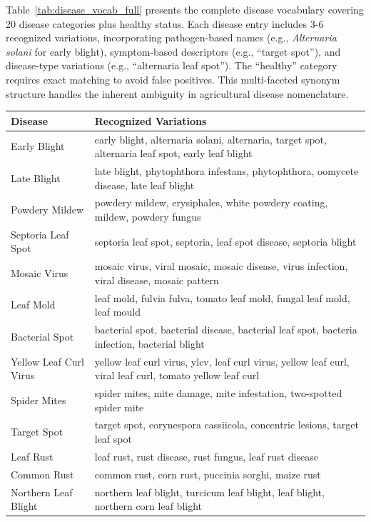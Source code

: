 \documentclass[11pt]{article}
\begin{document}
Table~\ref{tab:disease_vocab_full} presents the complete disease vocabulary covering 20 disease categories plus healthy status. Each disease entry includes 3-6 recognized variations, incorporating pathogen-based names (e.g., \emph{Alternaria solani} for early blight), symptom-based descriptors (e.g., ``target spot''), and disease-type variations (e.g., ``alternaria leaf spot''). The ``healthy'' category requires exact matching to avoid false positives. This multi-faceted synonym structure handles the inherent ambiguity in agricultural disease nomenclature.

\begin{table}[t]
\centering
\small
\setlength{\tabcolsep}{4pt}
\begin{tabular}{lp{12cm}}
\hline
\textbf{Disease} & \textbf{Recognized Variations} \\
\hline
Early Blight & early blight, alternaria solani, alternaria, target spot, alternaria leaf spot, early leaf blight \\
Late Blight & late blight, phytophthora infestans, phytophthora, oomycete disease, late leaf blight \\
Powdery Mildew & powdery mildew, erysiphales, white powdery coating, mildew, powdery fungus \\
Septoria Leaf Spot & septoria leaf spot, septoria, leaf spot disease, septoria blight \\
Mosaic Virus & mosaic virus, viral mosaic, mosaic disease, virus infection, viral disease, mosaic pattern \\
Leaf Mold & leaf mold, fulvia fulva, tomato leaf mold, fungal leaf mold, leaf mould \\
Bacterial Spot & bacterial spot, bacterial disease, bacterial leaf spot, bacteria infection, bacterial blight \\
Yellow Leaf Curl Virus & yellow leaf curl virus, ylcv, leaf curl virus, yellow leaf curl, viral leaf curl, tomato yellow leaf curl \\
Spider Mites & spider mites, mite damage, mite infestation, two-spotted spider mite \\
Target Spot & target spot, corynespora cassiicola, concentric lesions, target leaf spot \\
Leaf Rust & leaf rust, rust disease, rust fungus, leaf rust disease \\
Common Rust & common rust, corn rust, puccinia sorghi, maize rust \\
Northern Leaf Blight & northern leaf blight, turcicum leaf blight, leaf blight, northern corn leaf blight \\

\end{tabular}
\end{table}
\end{document}
